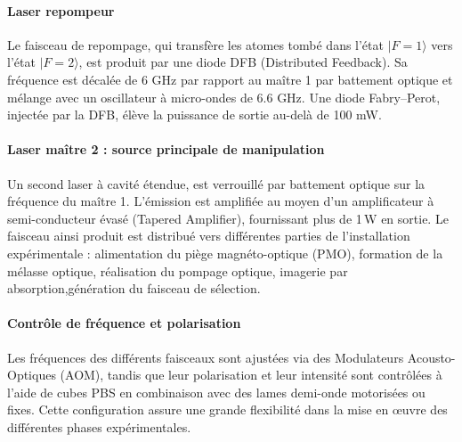 \paragraph{Laser repompeur}
Le faisceau de repompage, qui transfère les atomes tombé  dans l’état $|F=1\rangle$ vers l’état $|F=2\rangle$, est produit par une diode DFB (Distributed Feedback). Sa fréquence est décalée de 6 GHz par rapport au maître 1 par battement optique et mélange avec un oscillateur à micro-ondes de 6.6 GHz. Une diode Fabry–Perot, injectée par la DFB, élève la puissance de sortie au-delà de 100 mW.


\paragraph{Laser maître 2 : source principale de manipulation}
Un second laser à cavité étendue, est verrouillé par battement optique sur la fréquence du maître 1. L’émission est amplifiée au moyen d’un amplificateur à semi-conducteur évasé (Tapered Amplifier), fournissant plus de 1\,W en sortie. Le faisceau ainsi produit est distribué vers différentes parties de l’installation expérimentale : alimentation du piège magnéto-optique (PMO), formation de la mélasse optique, réalisation du pompage optique, imagerie par absorption,génération du faisceau de sélection.


\paragraph{Contrôle de fréquence et polarisation}
Les fréquences des différents faisceaux sont ajustées via des Modulateurs Acousto-Optiques (AOM), tandis que leur polarisation et leur intensité sont contrôlées à l’aide de cubes PBS en combinaison avec des lames demi-onde motorisées ou fixes. Cette configuration assure une grande flexibilité dans la mise en œuvre des différentes phases expérimentales.


